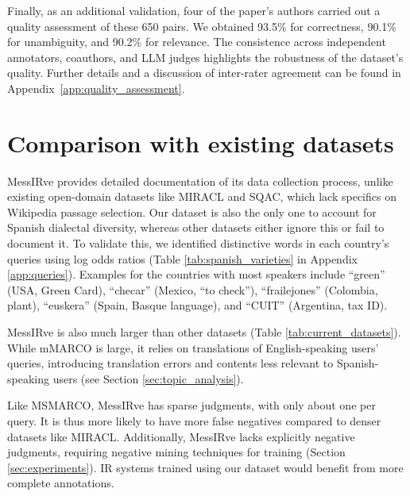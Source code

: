 \documentclass[11pt]{article}
\begin{document}
Finally, as an additional validation, four of the paper's authors carried out a quality assessment of these 650 pairs.
We obtained 93.5\% for correctness, 90.1\% for unambiguity, and 90.2\% for relevance.
The consistence across independent annotators, coauthors, and LLM judges highlights the robustness of the dataset's quality.
Further details and a discussion of inter-rater agreement can be found in Appendix~\ref{app:quality_assessment}.




\section{Comparison with existing datasets} \label{sec:comparison}


MessIRve provides detailed documentation of its data collection process, unlike existing open-domain datasets like MIRACL and SQAC, which lack specifics on Wikipedia passage selection. Our dataset is also the only one to account for Spanish dialectal diversity, whereas other datasets either ignore this or fail to document it. To validate this, we identified distinctive words in each country's queries using log odds ratios (Table \ref{tab:spanish_varieties} in Appendix \ref{app:queries}). Examples for the countries with most speakers include ``green'' (USA, Green Card), ``checar'' (Mexico, ``to check''), ``frailejones'' (Colombia, plant), ``euskera'' (Spain, Basque language), and ``CUIT'' (Argentina, tax ID).


MessIRve is also much larger than other datasets (Table \ref{tab:current_datasets}). While mMARCO is large, it relies on translations of English-speaking users' queries, introducing translation errors and contents less relevant to Spanish-speaking users (see Section \ref{sec:topic_analysis}).


Like MSMARCO, MessIRve has sparse judgments, with only about one per query. It is thus more likely to have more false negatives compared to denser datasets like MIRACL. Additionally, MessIRve lacks explicitly negative judgments, requiring negative mining techniques for training (Section \ref{sec:experiments}). IR systems trained using our dataset would benefit from more complete annotations.
\end{document}
